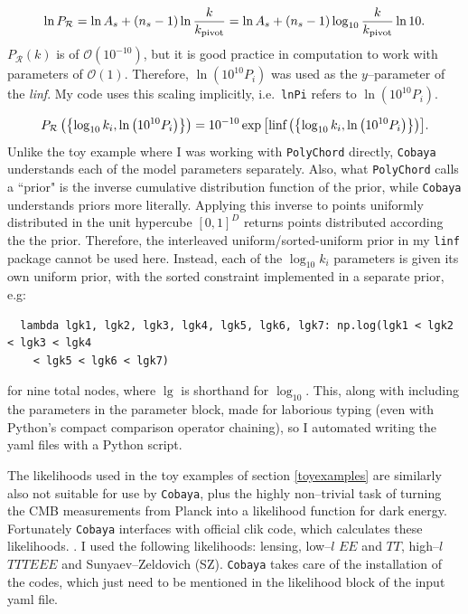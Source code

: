 \documentclass{article}
\begin{document}
\begin{equation}
  \ln{P_\mathcal R} = \ln{A_s} + \left(n_s - 1\right) \ln{\frac{k}{k_\textrm{pivot}}} = \ln{A_s} + \left(n_s - 1\right) \log_{10}{\frac{k}{k_\textrm{pivot}}} \ln{10}\textrm.
\end{equation}
%
$P_\mathcal R(k)$ is of $\mathcal{O}\left(10^{-10}\right)$, but it is good practice in computation to work with parameters of $\mathcal{O}\left(1\right)$. Therefore, $\ln{\left(10^{10}P_i\right)}$  was used as the $y$--parameter of the \textit{linf}. My code uses this scaling implicitly, i.e.\ \texttt{lnPi} refers to $\ln{\left(10^{10}P_i\right)}$.

\begin{equation}
  P_\mathcal R\left(\left\{\log_{10}{k_i}, \ln{\left(10^{10}P_i\right)}\right\}\right) = 10^{-10} \exp{\left[{\textrm{linf}\left(\left\{\log_{10}{k_i}, \ln{\left(10^{10}P_i\right)}\right\}\right)}\right]}\textrm.
\end{equation}
%
Unlike the toy example where I was working with \texttt{PolyChord} directly, \texttt{Cobaya} understands each of the model parameters separately. Also, what \texttt{PolyChord} calls a ``prior" is the inverse cumulative distribution function of the prior, while \texttt{Cobaya} understands priors more literally. Applying this inverse to points uniformly distributed in the unit hypercube $[0, 1]^D$ returns points distributed according the the prior. Therefore, the interleaved uniform/sorted-uniform prior in my \texttt{linf} package cannot be used here. Instead, each of the $\log_{10}{k_i}$ parameters is given its own uniform prior, with the sorted constraint implemented in a separate prior, e.g:
\begin{verbatim}
  lambda lgk1, lgk2, lgk3, lgk4, lgk5, lgk6, lgk7: np.log(lgk1 < lgk2 < lgk3 < lgk4 
    < lgk5 < lgk6 < lgk7)
\end{verbatim}
for nine total nodes, where $\lg$ is shorthand for $\log_{10}$. This, along with including the parameters in the parameter block, made for laborious typing (even with Python's compact comparison operator chaining), so I automated writing the yaml files with a Python script.

The likelihoods used in the toy examples of section \ref{toyexamples} are similarly also not suitable for use by \texttt{Cobaya}, plus the highly non--trivial task of turning the CMB measurements from Planck into a likelihood function for dark energy. Fortunately \texttt{Cobaya} interfaces with official clik code, which calculates these likelihoods. \cite{planck_likelihoods_1, planck_likelihoods_2}. I used the following likelihoods: lensing, low--$l$ $EE$ and $TT$, high--$l$ $TTTEEE$ and Sunyaev–Zeldovich (SZ). \texttt{Cobaya} takes care of the installation of the codes, which just need to be mentioned in the likelihood block of the input yaml file.
\end{document}
